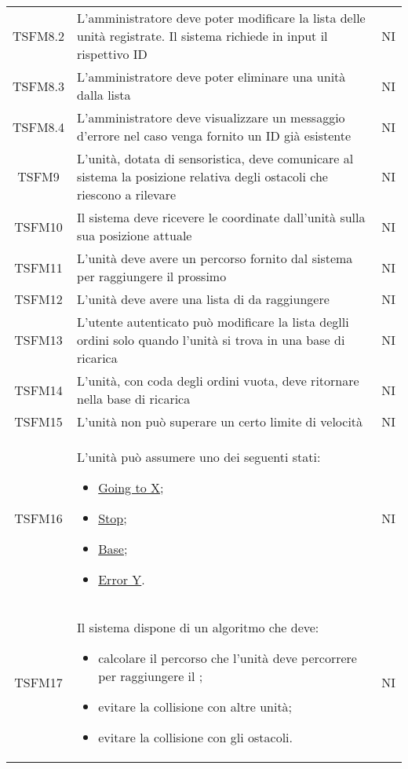 \begin{longtable}[h!] { c  m{12cm} c}
		TSFM8.2 & 	L'amministratore deve poter modificare la lista delle unità registrate. Il sistema richiede in input il rispettivo ID & NI\\

		TSFM8.3 & L'amministratore deve poter eliminare una unità dalla lista & NI\\

		TSFM8.4  & L'amministratore deve visualizzare un messaggio d'errore nel caso venga fornito un ID già esistente & NI \\

		TSFM9   & L'unità, dotata di sensoristica, deve comunicare al sistema la posizione relativa degli ostacoli che riescono a rilevare & NI \\

		TSFM10 & Il sistema deve ricevere le coordinate dall'unità sulla sua posizione attuale & NI \\

		TSFM11 & L'unità deve avere un percorso fornito dal sistema per raggiungere il prossimo \glock{POI} & NI \\

		TSFM12 & L'unità deve avere una lista di \glock{POI} da raggiungere & NI \\

		TSFM13  & L'utente autenticato può modificare la lista deglli ordini solo quando l'unità si trova in una base di ricarica & NI \\

		TSFM14  & L'unità, con coda degli ordini vuota, deve ritornare nella base di ricarica & NI \\

		TSFM15  & L'unità non può superare un certo limite di velocità & NI \\

		TSFM16 & L'unità può assumere uno dei seguenti stati:
				\begin{itemize}
					\item \underline{Going to X};
					\item \underline{Stop};
					\item \underline{Base};
					\item \underline{Error Y}.
				\end{itemize}
										& NI \\

		TSFM17  & Il sistema dispone di un algoritmo che deve:
				\begin{itemize}
					\item calcolare il percorso che l'unità deve percorrere per raggiungere il \glock{POI};
					\item evitare la collisione con altre unità;
					\item evitare la collisione con gli ostacoli.
				\end{itemize}
										& NI \\


\end{longtable}
